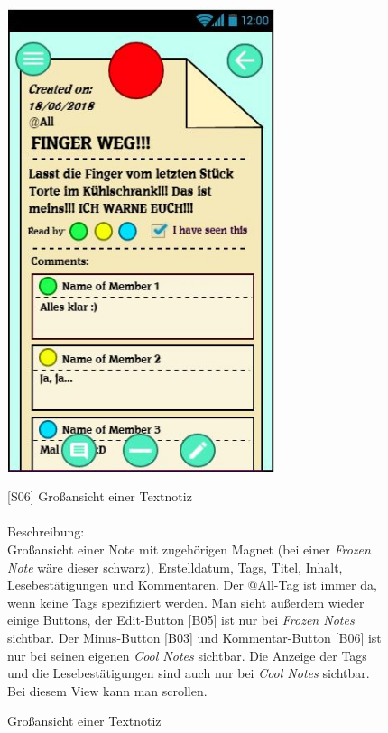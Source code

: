 \documentclass[a4paper]{scrreprt}
\begin{document}
    	\begin{figure}[h]
    		\begin{minipage}[b]{0.4\linewidth}
    			
    			\flushright
    			\centering
    			\includegraphics[width=0.7\textwidth]{fridget_notebig.JPG}
    			\caption{Großansicht einer Textnotiz}
    			\label{fig:figure1}
    			\vspace{13cm}
    		\end{minipage}
    		\hspace{0.5cm}
    		\begin{minipage}[b]{0.55\linewidth}
    			\flushleft
    			{[}S06{]} Großansicht einer Textnotiz \\
    			\hfill
    			\\Beschreibung: \\
    			Großansicht einer Note mit zugehörigen Magnet  (bei einer \textit{Frozen Note} wäre dieser schwarz), Erstelldatum, Tags, Titel, Inhalt, Lesebestätigungen und Kommentaren. Der @All-Tag ist immer da, wenn keine Tags spezifiziert werden. Man sieht außerdem wieder einige Buttons, der Edit-Button {[}B05{]} ist nur bei \textit{Frozen Notes} sichtbar. Der Minus-Button {[}B03{]}  und Kommentar-Button {[}B06{]} ist nur bei seinen eigenen \textit{Cool Notes} sichtbar. Die Anzeige der Tags und die Lesebestätigungen sind auch nur bei \textit{Cool Notes} sichtbar. Bei diesem View kann man scrollen.

\end{minipage}
\end{figure}
\end{document}
